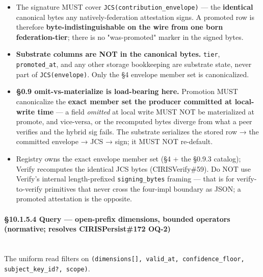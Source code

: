 \documentclass[10pt]{article}
\begin{document}
\begin{itemize}\setlength\itemsep{0pt}
\item The signature MUST cover \texttt{JCS(contribution\_envelope)} — the \textbf{identical} canonical bytes any natively-federation attestation signs. A promoted row is therefore \textbf{byte-indistinguishable on the wire from one born federation-tier}; there is no "was-promoted" marker in the signed bytes.
\item \textbf{Substrate columns are NOT in the canonical bytes.} \texttt{tier}, \texttt{promoted\_at}, and any other storage bookkeeping are substrate state, never part of \texttt{JCS(envelope)}. Only the §4 envelope member set is canonicalized.
\item \textbf{§0.9 omit-vs-materialize is load-bearing here.} Promotion MUST canonicalize the \textbf{exact member set the producer committed at local-write time} — a field \textit{omitted} at local write MUST NOT be materialized at promote, and vice-versa, or the recomputed bytes diverge from what a peer verifies and the hybrid sig fails. The substrate serializes the stored row → the committed envelope → JCS → sign; it MUST NOT re-default.
\item Registry owns the exact envelope member set (§4 + the §0.9.3 catalog); Verify recomputes the identical JCS bytes (CIRISVerify\#59). Do NOT use Verify's internal length-prefixed \texttt{signing\_bytes} framing — that is for verify-to-verify primitives that never cross the four-impl boundary as JSON; a promoted attestation is the opposite.
\end{itemize}


\paragraph{§10.1.5.4 Query — open-prefix dimensions, bounded operators (normative; resolves CIRISPersist\#172 OQ-2)}\mbox{}\\


The uniform read filters on \texttt{(dimensions[], valid\_at, confidence\_floor, subject\_key\_id?, scope)}.
\end{document}
